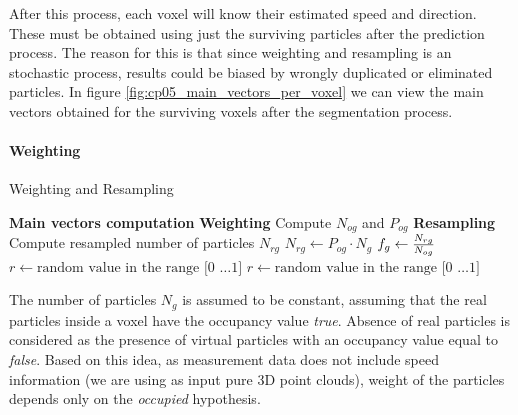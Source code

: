 After this process, each voxel will know their estimated speed and direction. These must be obtained using just the surviving particles after the prediction process. The reason for this is that since weighting and resampling is an stochastic process, results could be biased by wrongly duplicated or eliminated particles. In figure \ref{fig:cp05_main_vectors_per_voxel} we can view the main vectors obtained for the surviving voxels after the segmentation process.


\paragraph{Weighting}\label{ch:chapter05_01_04_02_02}

\begin{algorithm}[h!]
\caption{Weighting and Resampling}
\label{alg:cp05_weighting_resampling}
\begin{algorithmic}
    \State \textbf{Main vectors computation}
      \State {}
    \State
    \State \textbf{Weighting}
      \State \indent Compute $N_{og}$ and $P_{og}$
      \State
    \State \textbf{Resampling}
      \State \indent Compute resampled number of particles $N_{rg}$
      \State \indent $N_{rg} \gets P_{og} \cdot N_g$
      \State \indent $f_g \gets {{N_{rg}} \over {N_{og}}}$
       
	 
	 
	\EndFor
	\State $r \gets \text{random value in the range [0 \ldots 1]}$
	\EndIf
      \Else {}
	\State $r \gets \text{random value in the range [0 \ldots 1]}$
	\EndIf
      \EndIf
    \EndFor
  \EndFor
\EndFunction
\end{algorithmic}
\end{algorithm}

The number of particles $N_g$ is assumed to be constant, assuming that the real particles inside a voxel have the occupancy value \emph{true}. Absence of real particles is considered as the presence of virtual particles with an occupancy value equal to \emph{false}. Based on this idea, as measurement data does not include speed information (we are using as input pure 3D point clouds), weight of the particles depends only on the \emph{occupied} hypothesis.

